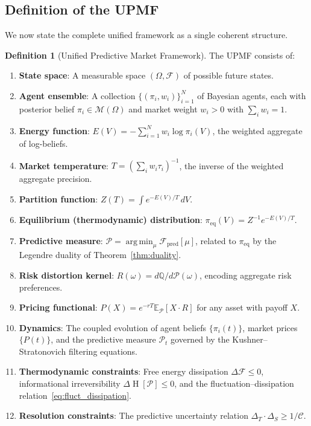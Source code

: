\documentclass[12pt,a4paper]{article}
\theoremstyle{definition}
\newtheorem{definition}[theorem]{Definition}
\newcommand{\E}{\mathbb{E}}
\newcommand{\Q}{\mathbb{Q}}
\newcommand{\F}{\mathcal{F}}
\newcommand{\M}{\mathcal{M}}
\newcommand{\PP}{\mathcal{P}}
\DeclareMathOperator*{\argmin}{arg\,min}
\DeclareMathOperator{\Ent}{H}
\begin{document}
\subsection{Definition of the UPMF}

We now state the complete unified framework as a single coherent structure.

\begin{definition}[Unified Predictive Market Framework]\label{def:upmf}
The UPMF consists of:
\begin{enumerate}[label=(\Roman*)]
    \item \textbf{State space}: A measurable space $(\Omega, \F)$ of possible future states.
    
    \item \textbf{Agent ensemble}: A collection $\{(\pi_i, w_i)\}_{i=1}^N$ of Bayesian agents, each with posterior belief $\pi_i \in \M(\Omega)$ and market weight $w_i > 0$ with $\sum_i w_i = 1$.
    
    \item \textbf{Energy function}: $E(V) = -\sum_{i=1}^N w_i \log \pi_i(V)$, the weighted aggregate of log-beliefs.
    
    \item \textbf{Market temperature}: $T = (\sum_i w_i \tau_i)^{-1}$, the inverse of the weighted aggregate precision.
    
    \item \textbf{Partition function}: $Z(T) = \int e^{-E(V)/T} \, dV$.
    
    \item \textbf{Equilibrium (thermodynamic) distribution}: $\pi_{\text{eq}}(V) = Z^{-1} e^{-E(V)/T}$.
    
    \item \textbf{Predictive measure}: $\PP = \argmin_\mu \mathcal{F}_{\text{pred}}[\mu]$, related to $\pi_{\text{eq}}$ by the Legendre duality of Theorem~\ref{thm:duality}.
    
    \item \textbf{Risk distortion kernel}: $R(\omega) = d\Q/d\PP(\omega)$, encoding aggregate risk preferences.
    
    \item \textbf{Pricing functional}: $P(X) = e^{-rT} \E_\PP[X \cdot R]$ for any asset with payoff $X$.
    
    \item \textbf{Dynamics}: The coupled evolution of agent beliefs $\{\pi_i(t)\}$, market prices $\{P(t)\}$, and the predictive measure $\PP_t$ governed by the Kushner--Stratonovich filtering equations.
    
    \item \textbf{Thermodynamic constraints}: Free energy dissipation $\Delta \mathcal{F} \leq 0$, informational irreversibility $\Delta \Ent[\PP] \leq 0$, and the fluctuation--dissipation relation~\eqref{eq:fluct_dissipation}.
    
    \item \textbf{Resolution constraints}: The predictive uncertainty relation $\Delta_T \cdot \Delta_S \geq 1/\mathcal{C}$.
\end{enumerate}
\end{definition}
\end{document}
